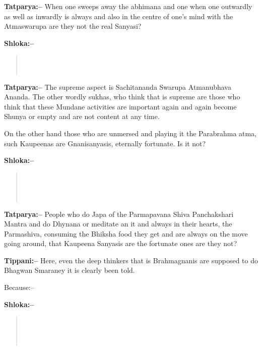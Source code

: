 \textbf{Tatparya:–} When one sweeps away the abhimana and one when one outwardly as well as inwardly is always and also in the centre of one's mind with the Atmaswarupa are they not the real Sanyasi?

\textbf{Shloka:–}

\begin{verse}
 \\\\ 
\end{verse}

\textbf{Tatparya:–} The supreme aspect is Sachitananda Swarupa Atmanubhava Ananda. The other wordly sukhas, who think that is supreme are those who think that these Mundane activities are important again and again become Shunya or empty and are not content at any time.

On the other hand those who are unmersed and playing it the Parabrahma atma, such Kaupeenas are Gnanisanyasis, eternally fortunate. Is it not?

\textbf{Shloka:–}

\begin{verse}
 \\\\\\ 
\end{verse}

\textbf{Tatparya:–} People who do Japa of the Parmapavana Shiva Panchakshari Mantra and do Dhynana or meditate an it and always in their hearts, the Parmashiva, consuming the Bhiksha food they get and are always on the move going around, that Kaupeena Sanyasis are the fortunate ones are they not?

\textbf{Tippani:–} Here, even the deep thinkers that is Brahmagnanis are supposed to do Bhagwan Smaraney it is clearly been told.

Because:–

\textbf{Shloka:–}

\begin{verse}
 \\\\\\
\end{verse}

